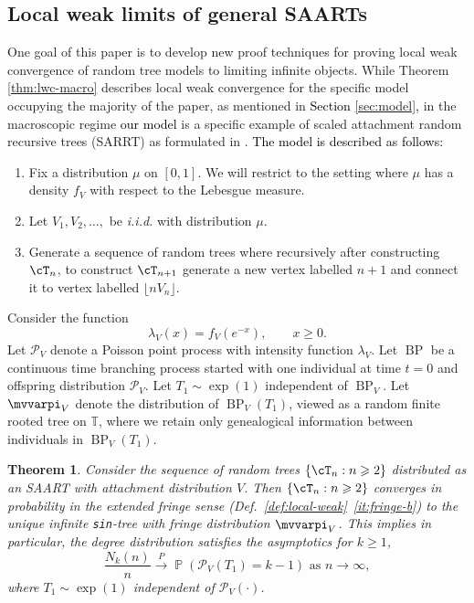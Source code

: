 \documentclass[letterpaper,11pt,reqno]{amsart}
\newenvironment{enumeratea}{\begin{enumerate}[\upshape a)]\setlength{\itemsep}{1ex}}{\end{enumerate}}
\newtheorem{thm}{Theorem}[section]
\theoremstyle{definition}
\renewcommand{\geq}{\geqslant}
\newcommand{\set}[1]{\left\{#1\right\}}
\newcommand{\cP}{\mathcal{P}}\newcommand{\cQ}{\mathcal{Q}}\newcommand{\cR}{\mathcal{R}}
\DeclareMathOperator{\pr}{\mathds{P}}
\newcommand{\bbT}{\mathbb{T}}
\newcommand{\convp}{\stackrel{P}{\longrightarrow}}
\DeclareMathOperator{\BP}{BP}
\newcommand{\fpm}{\mvvarpi}
\begin{document}
\subsection{Local weak limits of general SAARTs}\label{sec:SARRTs}
One goal of this paper is to develop new proof techniques for proving local weak convergence of random tree models to limiting infinite objects. While Theorem \ref{thm:lwc-macro} describes local weak convergence for the specific model occupying the majority of the paper, as mentioned in \textcolor{black}{Section \ref{sec:model},} in the macroscopic regime \textcolor{black}{our model} is a specific example of scaled attachment random recursive trees (SARRT) as formulated in \cite{devroye2012depth}. \textcolor{black}{The model is described as follows:} 
\begin{enumeratea}
    \item Fix a distribution $\mu$ on $[0,1]$. We will restrict to the setting where $\mu$ has a density $f_V$ with respect to the Lebesgue measure. 
    \item Let $V_1, V_2, \ldots, $ be \emph{i.i.d.} with distribution $\mu$. 
    \item Generate a sequence of random trees where recursively after constructing $\cT_n$, to construct $\cT_{n+1}$ generate a new vertex labelled $n+1$ and connect it to vertex labelled $\lfloor n V_n \rfloor$. 
\end{enumeratea}
Consider the function 
\[\lambda_V(x) = f_V(e^{-x}), \qquad x\geq 0. \]
Let $\cP_V$ denote a Poisson point process with intensity function $\lambda_V$. Let $\BP$ be a continuous time branching process started with one individual at time $t=0$ and offspring distribution $\cP_V$. Let $T_1\sim \exp(1)$ independent of $\BP_V$. Let $\fpm_{V}$ denote the distribution of $\BP_{V}(T_1)$, viewed as a random finite rooted tree on $\bbT$, where we retain only genealogical information between individuals in $\BP_{V}(T_1)$. 
\begin{thm}
\label{thm:lwc-saart}
     Consider the sequence of random trees $\set{\cT_n:n\geq 2}$ distributed as an SAART with attachment distribution $V$.  Then $\set{\cT_n:n\geq 2}$ converges in probability in the extended fringe sense (Def.~\ref{def:local-weak}~\eqref{it:fringe-b}) to the unique infinite {\tt sin}-tree with fringe distribution $\fpm_{V}$. This implies in particular, the degree distribution satisfies the asymptotics for $k\geq 1$,
     \[
\frac{N_k(n)}{n} \convp \pr(\cP_V(T_1) = k-1) \text{ as } n\to\infty,
\]
where $T_1\sim \exp(1)$ independent of $\cP_V(\cdot)$. 
\end{thm}
\end{document}
